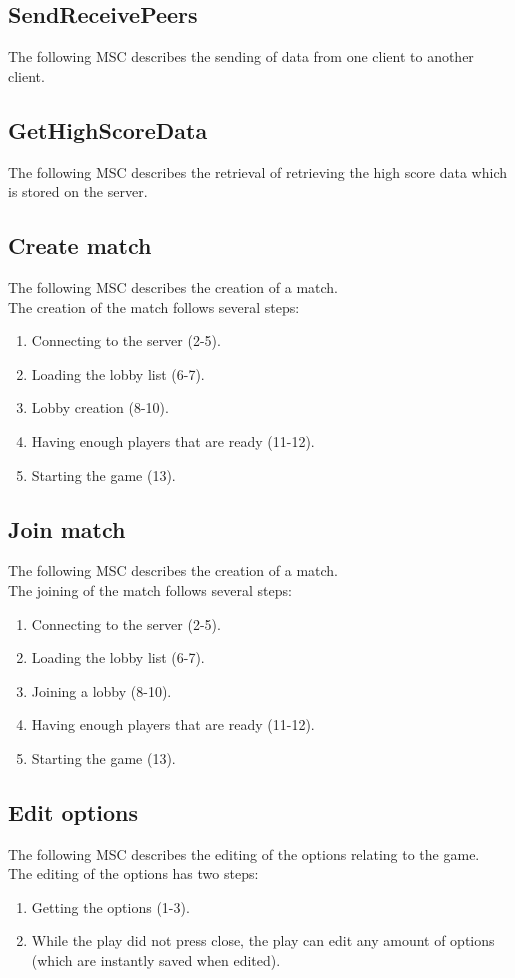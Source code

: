 \documentclass[a4paper,twoside,11pt]{article}
\begin{document}
\subsection{SendReceivePeers}
The following MSC describes the sending of data from one client to another client.

\subsection{GetHighScoreData}
The following MSC describes the retrieval of retrieving the high score data which is stored on the server.

\subsection{Create match}
The following MSC describes the creation of a match.\\
The creation of the match follows several steps:
\begin{enumerate}
\item Connecting to the server (2-5).
\item Loading the lobby list (6-7).
\item Lobby creation (8-10).
\item Having enough players that are ready (11-12).
\item Starting the game (13).
\end{enumerate}

\subsection{Join match}
The following MSC describes the creation of a match.\\
The joining of the match follows several steps:
\begin{enumerate}
\item Connecting to the server (2-5).
\item Loading the lobby list (6-7).
\item Joining a lobby (8-10).
\item Having enough players that are ready (11-12).
\item Starting the game (13).
\end{enumerate}

\subsection{Edit options}
The following MSC describes the editing of the options relating to the game.\\
The editing of the options has two steps:
\begin{enumerate}
\item Getting the options (1-3).
\item While the play did not press close, the play can edit any amount of options (which are instantly saved when edited).
\end{enumerate}
\end{document}
